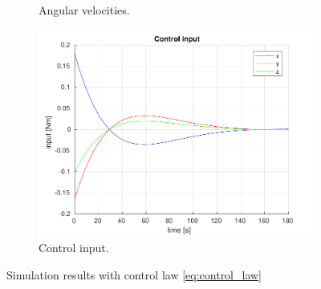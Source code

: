 \begin{figure}[ht]
\begin{subfigure}[b]{0.45\textwidth}
		\caption{Angular velocities.}
		\label{fig:2b}
	\end{subfigure}
	\begin{subfigure}[b]{0.45\textwidth}
		\includegraphics[width=\textwidth]{1_3_control_input}
		\caption{Control input.}
		\label{fig:2c}
	\end{subfigure}
	\caption{Simulation results with control law \eqref{eq:control_law}}\label{fig:zero_control_law}
\end{figure}

